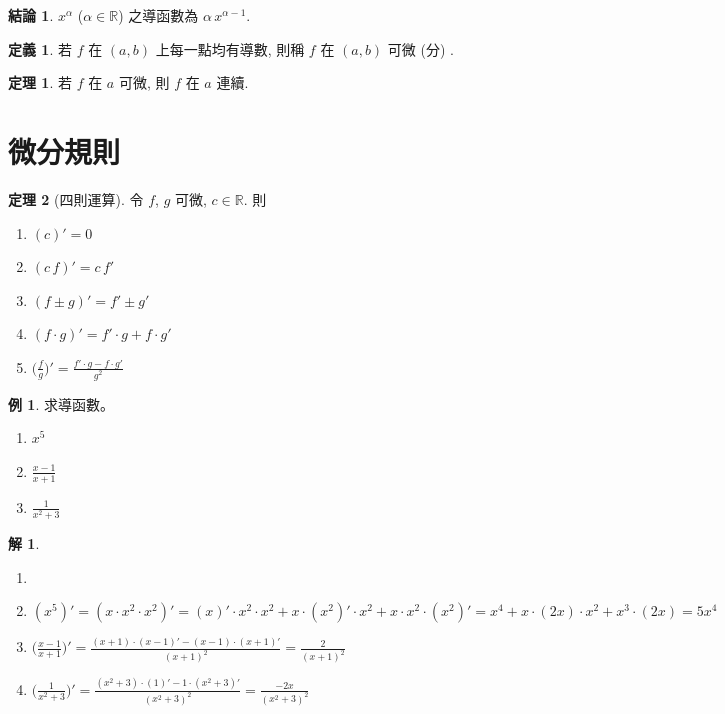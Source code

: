 \documentclass[12pt,a4paper]{extarticle}
\newcommand{\ds}{\displaystyle}
\theoremstyle{definition}
\newtheorem*{dfn}{定義}
\newtheorem*{fact}{結論}
\newtheorem*{thm}{定理}
\newtheorem*{ex}{例}
\newtheorem*{sol}{解}
\begin{document}
\begin{fact}
  $x^\alpha$ ($\alpha\in\mathbb{R}$) 之導函數為 $\alpha\,x^{\alpha - 1}$. 
\end{fact}

\begin{dfn}
  若 $f$ 在 $(a, b)$ 上每一點均有導數, 則稱 $f$ 在 $(a, b)$ 可微 (分) . 
\end{dfn}

\begin{thm}
  若 $f$ 在 $a$ 可微, 則 $f$ 在 $a$ 連續. 
\end{thm}

\section*{微分規則}

\begin{thm}[四則運算] 令 $f$, $g$ 可微, $c\in\mathbb{R}$. 則
  \setlength{\columnsep}{-0mm}
  \begin{multicols}{3}
    \begin{enumerate}\setlength\itemsep{0em}
      \item $\ds (c)' = 0$
      \item $\ds (c\,f)' = c\,f'$
      \item $\ds (f\pm g)' = f'\pm g'$
      \item $\ds (f\cdot g)' = f'\cdot g + f\cdot g'$
      \item $\ds \Big(\frac{f}{g}\Big)' = \frac{f'\cdot g - f\cdot g'}{g^2}$
    \end{enumerate}
  \end{multicols}
\end{thm}

\begin{ex} 求導函數。
  \begin{multicols}{3}
    \begin{enumerate}\setlength\itemsep{0em}
      \item $x^5$
      \item $\frac{x - 1}{x + 1}$
      \item $\frac{1}{x^2 + 3}$
    \end{enumerate}
  \end{multicols}
\end{ex}

\begin{sol}
  \begin{enumerate}\setlength\itemsep{0em}
    \item[]
    \item $\ds (x^5)' = (x \cdot x^2 \cdot x^2)' = (x)'\cdot x^2 \cdot x^2 + x\cdot(x^2)'\cdot x^2 + x\cdot x^2\cdot(x^2)' = x^4 + x\cdot(2x)\cdot x^2 + x^3\cdot(2x) = 5 x^4$
    \item $\ds\Big(\frac{x - 1}{x + 1}\Big)' = \frac{(x + 1)\cdot(x - 1)' - (x - 1)\cdot(x + 1)'}{(x + 1)^2} = \frac{2}{(x + 1)^2}$ 
    \item $\ds\Big(\frac{1}{x^2 + 3}\Big)' = \frac{(x^2 + 3)\cdot(1)' - 1\cdot(x^2 + 3)'}{(x^2 + 3)^2} = \frac{-2x}{(x^2 + 3)^2}$
  \end{enumerate}
\end{sol}
\end{document}
